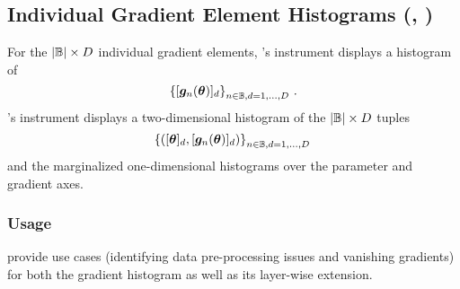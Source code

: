 \subsection{Individual Gradient Element Histograms (,
  )}
For the $|{\mathbb{B}}| \times D$ individual gradient elements, \cockpit's
 instrument displays a histogram of
\begin{equation}
  \label{cockpit::eq:app-grad-hist-1d}
  \left\{
    [{\bm{g}}_n({\bm{\theta}})]_d
  \right\}_{n\in{\mathbb{B}},d=1,\dots, D}\,.
\end{equation}
\cockpit's  instrument displays a two-dimensional histogram
of the $|{\mathbb{B}}| \times D$ tuples
\begin{equation}
  \label{cockpit::eq:app-grad-hist-2d}
  \left\{
    \left(
      [{\bm{\theta}}]_d,
      [{\bm{g}}_n({\bm{\theta}})]_d
    \right)
  \right\}_{n\in{\mathbb{B}},d=1,\dots, D}\,
\end{equation}
and the marginalized one-dimensional histograms over the parameter and gradient
axes.

\subsubsection{Usage}

provide use cases (identifying data pre-processing issues and vanishing
gradients) for both the gradient histogram as well as its layer-wise extension.


